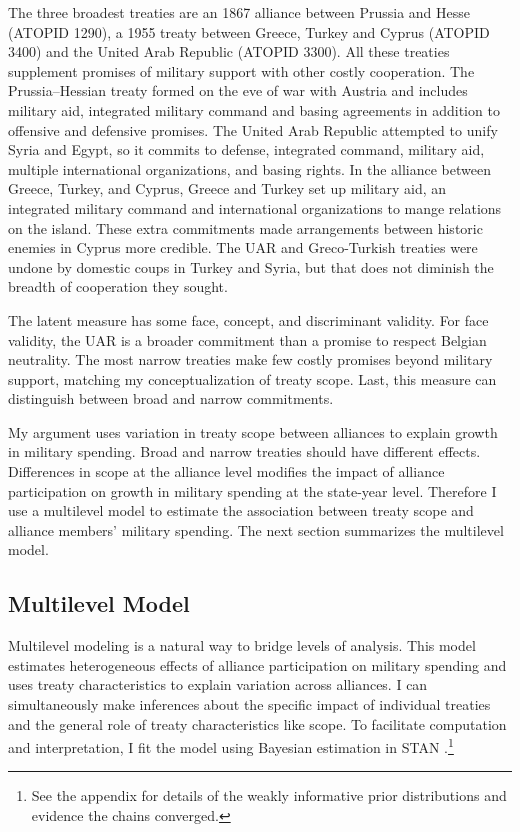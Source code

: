\documentclass[12pt]{article}
\begin{document}
The three broadest treaties are an 1867 alliance between Prussia and Hesse (ATOPID 1290), a 1955 treaty between Greece, Turkey and Cyprus (ATOPID 3400) and the United Arab Republic (ATOPID 3300).  
All these treaties supplement promises of military support with other costly cooperation. 
The Prussia--Hessian treaty formed on the eve of war with Austria and includes military aid, integrated military command and basing agreements in addition to offensive and defensive promises. 
The United Arab Republic attempted to unify Syria and Egypt, so it commits to defense, integrated command, military aid, multiple international organizations, and basing rights. 
In the alliance between Greece, Turkey, and Cyprus, Greece and Turkey set up military aid, an integrated military command and international organizations to mange relations on the island.
These extra commitments made arrangements between historic enemies in Cyprus more credible. 
The UAR and Greco-Turkish treaties were undone by domestic coups in Turkey and Syria, but that does not diminish the breadth of cooperation they sought. 


The latent measure has some face, concept, and discriminant validity. 
For face validity, the UAR is a broader commitment than a promise to respect Belgian neutrality. 
The most narrow treaties make few costly promises beyond military support, matching my conceptualization of treaty scope. 
Last, this measure can distinguish between broad and narrow commitments. 


My argument uses variation in treaty scope between alliances to explain growth in military spending.
Broad and narrow treaties should have different effects. 
Differences in scope at the alliance level modifies the impact of alliance participation on growth in military spending at the state-year level. 
Therefore I use a multilevel model to estimate the association between treaty scope and alliance members' military spending.  
The next section summarizes the multilevel model. 


\subsection{Multilevel Model} 


Multilevel modeling is a natural way to bridge levels of analysis.
This model estimates heterogeneous effects of alliance participation on military spending and uses treaty characteristics to explain variation across alliances. 
I can simultaneously make inferences about the specific impact of individual treaties and the general role of treaty characteristics like scope. 
To facilitate computation and interpretation, I fit the model using Bayesian estimation in STAN \citep{Carpenteretal2016}.\footnote{See the appendix for details of the weakly informative prior distributions and evidence the chains converged.}
\end{document}
